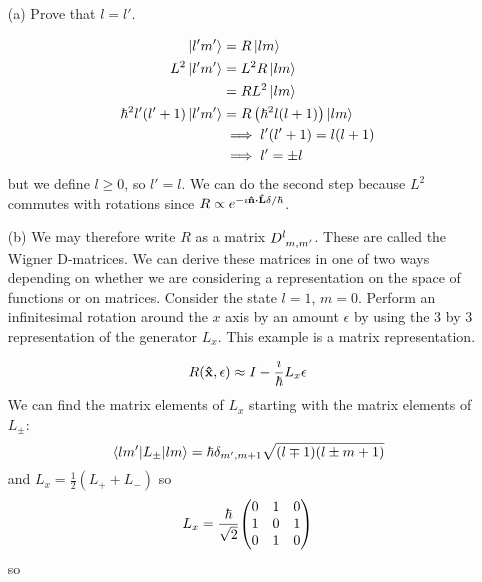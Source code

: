 \documentclass[a4paper,twoside]{article}
\begin{document}
\begin{itemize}
    \item[(a)] Prove that $ l = l' $.
        \begin{problem}
            \begin{align}
                \ket{l'm'} &= R\ket{lm} \\
                L^2\ket{l'm'} &= L^2 R\ket{lm} \\
                &= R L^2\ket{lm} \\
                \hbar^2 l'(l'+1)\ket{l'm'} &= R \left( \hbar^2 l(l+1) \right)\ket{lm} \\
                &\implies l'(l'+1) = l(l+1) \\
                &\implies l' = \pm l
            \end{align}
            but we define $ l \geq 0 $, so $ l' = l $. We can do the second step because $ L^2 $ commutes with rotations since $ R \propto e^{- \imath \vu{n} \vdot \vu{L} \delta / \hbar} $.
        \end{problem}
    \item[(b)] We may therefore write $ R $ as a matrix $ D\indices{^l_{m,m'}} $. These are called the Wigner D-matrices. We can derive these matrices in one of two ways depending on whether we are considering a representation on the space of functions or on matrices. Consider the state $ l = 1 $, $ m = 0 $. Perform an infinitesimal rotation around the $ x $ axis by an amount $ \epsilon $ by using the $ 3 $ by $ 3 $ representation of the generator $ L_x $. This example is a matrix representation.
        \begin{problem}
            \begin{equation}
                R(\vu{x}, \epsilon) \approx I - \frac{\imath}{\hbar} L_x \epsilon
            \end{equation}
            We can find the matrix elements of $ L_x $ starting with the matrix elements of $ L_{\pm} $:
            \begin{equation}
                \mel{lm'}{L_{\pm}}{lm} = \hbar \delta_{m',m+1} \sqrt{(l\mp 1)(l\pm m + 1)}
            \end{equation}
            and $ L_x = \frac{1}{2} (L_+ + L_-) $ so
            \begin{equation}
                L_x = \frac{\hbar}{\sqrt{2}} \mqty(0&1&0\\1&0&1\\0&1&0)
            \end{equation}
            so
            \begin{equation}

\end{equation}
\end{problem}
\end{itemize}
\end{document}
